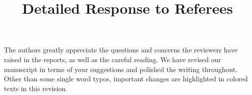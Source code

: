 \documentclass[10pt]{amsart}
\theoremstyle{definition}
\theoremstyle{remark}
\begin{document}
\title{\large Detailed Response to Referees}%

\date{}%

\maketitle

The authors greatly appreciate the questions and concerns the reviewers have raised in the reports, as well as the careful reading. 
We have revised our manuscript in terms of your suggestions and polished the writing throughout. 
Other than some single word typos, important changes are highlighted in colored texts in this revision. 



\tableofcontents


\vskip0.5cm
\end{document}
